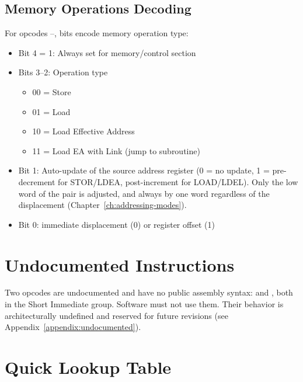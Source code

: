 \subsection{Memory Operations Decoding}

For opcodes --, bits encode memory operation type:

\begin{itemize}
	\item Bit 4 = 1: Always set for memory/control section
	\item Bits 3--2: Operation type
	      \begin{itemize}
		      \item 00 = Store
		      \item 01 = Load
		      \item 10 = Load Effective Address
		      \item 11 = Load EA with Link (jump to subroutine)
	      \end{itemize}
	\item Bit 1: Auto-update of the source address register (0 = no update, 1 = pre-decrement for STOR/LDEA, post-increment for
	      LOAD/LDEL). Only the low word of the pair is adjusted, and always by one word regardless of the displacement
	      (Chapter~\ref{ch:addressing-modes}).
	\item Bit 0: immediate displacement (0) or register offset (1)
\end{itemize}

\section{Undocumented Instructions}

Two opcodes are undocumented and have no public assembly syntax:  and , both in the Short
Immediate group. Software must not use them. Their behavior is architecturally undefined and reserved for future
revisions (see Appendix~\ref{appendix:undocumented}).

\section{Quick Lookup Table}

